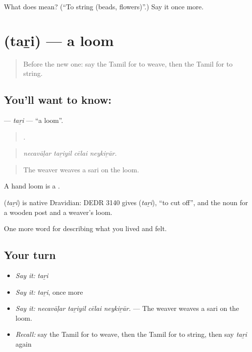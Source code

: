 \begin{tcolorbox}[breakable,colback=teal!4,colframe=teal!35!black,title={Before you move on}]
What does  mean? (\textquotedblleft{}To string (beads, flowers)\textquotedblright{}.) Say it once more.
\end{tcolorbox}
\section[\texorpdfstring{\ta{தறி} (taṟi)}{தறி (taṟi)}]{ (taṟi) — a loom}

\label{lesson:TA-C538-tari}



\begin{quote}
Before the new one: say the Tamil for to weave, then the Tamil for to string.
\end{quote}

\subsection*{You'll want to know: }
\textbf{} — \emph{taṟi} — \textquotedblleft{}a loom\textquotedblright{}.

\begin{quote}
   .
\end{quote}

\begin{quote}
\emph{necavāḷar taṟiyil cēlai neykiṟār.}
\end{quote}

\begin{quote}
The weaver weaves a sari on the loom.
\end{quote}

A hand loom is a .

\begin{cousinweb}
\textbf{} (\emph{taṟi}) is native Dravidian: DEDR 3140 gives  (\emph{taṟi}), \textquotedblleft{}to cut off\textquotedblright{}, and the noun for a wooden post and a weaver's loom.
\end{cousinweb}

\begin{grammarlens}[title={What you've built}]
One more word for describing what you lived and felt.
\end{grammarlens}

\subsection*{Your turn}
\begin{itemize}
\raggedright
  \item \emph{Say it:} \emph{taṟi}
  \item \emph{Say it:} \emph{taṟi}, once more
  \item \emph{Say it:} \emph{necavāḷar taṟiyil cēlai neykiṟār.} — The weaver weaves a sari on the loom.
  \item \emph{Recall:} say the Tamil for to weave, then the Tamil for to string, then say \emph{taṟi} again
\end{itemize}

